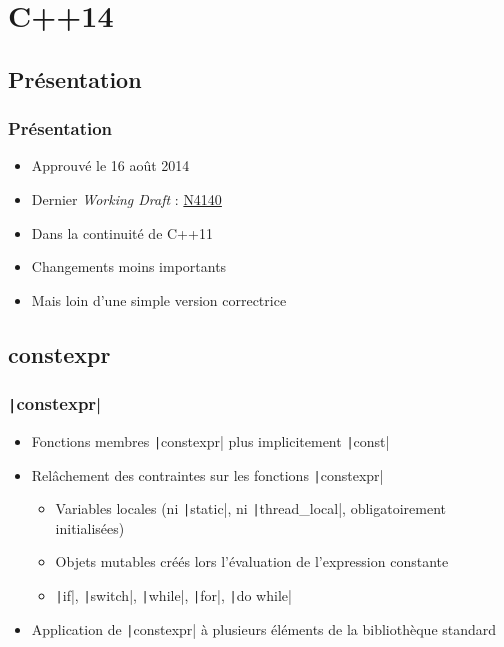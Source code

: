 \documentclass[C++.tex]{subfiles}
\begin{document}
\section{C++14}
\subsection*{Présentation}
\begin{frame}
	\frametitle{Présentation}
	\begin{itemize}
		\item Approuvé le 16 août 2014
		\item Dernier \textit{Working Draft} : \href{https://timsong-cpp.github.io/cppwp/n4140/draft.pdf}{N4140\linklogo}
		\item Dans la continuité de C++11
		\item Changements moins importants
		\item Mais loin d'une simple version correctrice
	\end{itemize}
\end{frame}

\subsection*{constexpr}
\begin{frame}[fragile]
	\frametitle{\texttt|constexpr|}
	\begin{itemize}
		\item Fonctions membres \texttt|constexpr| plus implicitement \texttt|const|
		\item Relâchement des contraintes sur les fonctions \texttt|constexpr|
		\begin{itemize}
			\item Variables locales (ni \texttt|static|, ni \texttt|thread_local|, obligatoirement initialisées)
			\item Objets mutables créés lors l'évaluation de l'expression constante
			\item \texttt|if|, \texttt|switch|, \texttt|while|, \texttt|for|, \texttt|do while|
		\end{itemize}
		\item Application de \texttt|constexpr| à plusieurs éléments de la bibliothèque standard
	\end{itemize}

\end{frame}
\end{document}
